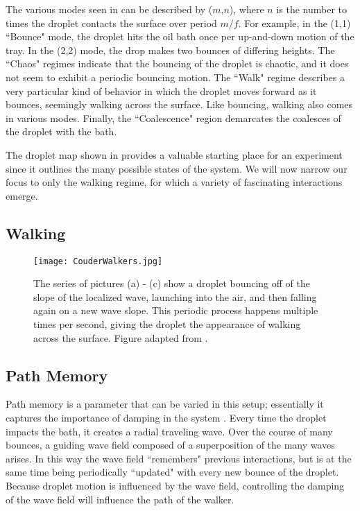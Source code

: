 The various modes seen in  can be described by ($m$,$n$), where $n$ is the number to times the droplet contacts the surface over period $m/f$. For example, in the (1,1) ``Bounce" mode, the droplet hits the oil bath once per up-and-down motion of the tray. In the (2,2) mode, the drop makes two bounces of differing heights. The ``Chaos" regimes indicate that the bouncing of the droplet is chaotic, and it does not seem to exhibit a periodic bouncing motion. The ``Walk" regime describes a very particular kind of behavior in which the droplet moves forward as it bounces, seemingly walking across the surface. Like bouncing, walking also comes in various modes. Finally, the ``Coalescence" region demarcates the coalesces of the droplet with the bath.

The droplet map shown in  provides a valuable starting place for an experiment since it outlines the many possible states of the system. We will now narrow our focus to only the walking regime, for which a variety of fascinating interactions emerge.

	                   \subsection{Walking}
            
            
            
             \begin{figure}[h]
	       \centering
	    \texttt{[image: CouderWalkers.jpg]}
	     \caption{The series of pictures (a) - (c) show a droplet bouncing off of the slope of the localized wave, launching into the air, and then falling again on a new wave slope. This periodic process happens multiple times per second, giving the droplet the appearance of walking across the surface. Figure adapted from .}
	 \label{Couderwalkers}
	\end{figure}


            \subsection{Path Memory}
                        
            Path memory is a parameter that can be varied in this setup; essentially it captures the importance of damping in the system . Every time the droplet impacts the bath, it creates a radial traveling wave. Over the course of many bounces, a guiding wave field composed of a superposition of the many waves arises. In this way the wave field ``remembers" previous interactions, but is at the same time being periodically ``updated" with every new bounce of the droplet. Because droplet motion is influenced by the wave field, controlling the damping of the wave field will influence the path of the walker. 
            
